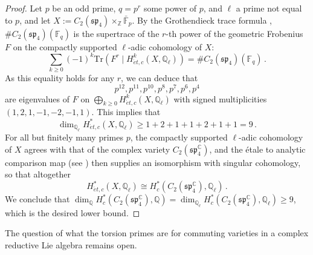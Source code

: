 \documentclass[oneside, 12pt, a4paper]{amsart}
\numberwithin{equation}{section}
\newcommand{\F}{\mathbb{F}}
\newcommand{\Z}{\mathbb{Z}}
\newcommand{\C}{\mathbb{C}}
\newcommand{\Q}{\mathbb{Q}}
\theoremstyle{plain}
\theoremstyle{definition}
\theoremstyle{remark}
\begin{document}
\begin{proof}
Let $p$ be an odd prime, $q=p^r$ some power of $p$, and $\ell$ a prime not equal to $p$, and let $X:=C_2(\mathfrak{sp}_4)\times_{\Z} \bar{\F}_p$. By the Grothendieck trace formula \cite{De77}, $\#C_2(\mathfrak{sp}_4)(\mathbb{F}_q)$ is the supertrace of the $r$-th power of the geometric Frobenius $F$ on the compactly supported $\ell$-adic cohomology of $X$:
\[
\sum_{k\geq 0} (-1)^k \mathrm{Tr}(F^r \mid H^k_{\acute{e}t,c}(X,\Q_\ell)) =\#C_2(\mathfrak{sp}_4)(\mathbb{F}_q)\, .
\]
As this equality holds for any $r$, we can deduce that 
\[
p^{12},p^{11},p^{10},p^8,p^7,p^6,p^4
\]
are eigenvalues of $F$ on $\bigoplus_{k\geq 0} H^k_{\acute{e}t,c}(X,\Q_\ell)$ with signed multiplicities $(1,2,1,-1,-2,-1,1)$. This implies that
\[
\dim_{\Q_\ell} H^\ast_{\acute{e}t,c}(X,\Q_\ell)\geq 1+2+1+1+2+1+1=9\,.
\]
For all but finitely many primes $p$, the compactly supported $\ell$-adic cohomology of $X$ agrees with that of the complex variety $C_2(\mathfrak{sp}_4^\C)$, and the étale to analytic comparison map (see \cite[Ch.~III,\S3]{Mi80}) then supplies an isomorphism with singular cohomology, so that altogether
\[H^*_{\acute{e}t,c}(X,\Q_{\ell})\cong H^*_{c}(C_2(\mathfrak{sp}^\C_4),\Q_{\ell})\, .\]
We conclude that $\dim_\Q H^\ast_c(C_2(\mathfrak{sp}_4^\C),\Q)=\dim_{\Q_\ell} H^\ast_c(C_2(\mathfrak{sp}_4^\C),\Q_{\ell})\geq 9$, which is the desired lower bound.
\end{proof}


The question of what the torsion primes are for commuting varieties in a complex reductive Lie algebra remains open.




\end{document}
